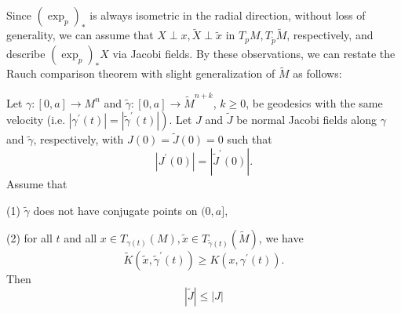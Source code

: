 \documentclass{ctexart}
\begin{document}
Since $(\exp_{p})_*$ is always isometric in the radial direction, without loss of generality, we can assume that $X \perp x, \widetilde{X} \perp \widetilde{x}$ 
in $T_pM, T_{\widetilde{p}}\widetilde{M}$, respectively, and describe $(\exp_{p})_* X$ via Jacobi fields. 
By these observations, we can restate the Rauch comparison theorem with slight generalization of $\widetilde{M}$ as follows:
\begin{theorem}
  Let $\gamma:[0, a] \rightarrow M^n$ and $\tilde{\gamma}:[0, a] \rightarrow \tilde{M}^{n+k}$, $k \geq 0$, be geodesics with the same velocity 
  (i.e. $\left.\left|\gamma^{\prime}(t)\right|=\left|\tilde{\gamma}^{\prime}(t)\right|\right)$. 
  Let $J$ and $\tilde{J}$ be normal Jacobi fields along $\gamma$ and $\tilde{\gamma}$, respectively, with $J(0)=\tilde{J}(0)=0$ such that
  $$
  \left|J^{\prime}(0)\right|=\left|\tilde{J}^{\prime}(0)\right| .
  $$
  Assume that 

  (1) $\tilde{\gamma}$ does not have conjugate points on $(0, a]$, 

  (2) for all $t$ and all $x \in T_{\gamma(t)}(M), \tilde{x} \in T_{\tilde{\gamma}(t)}(\tilde{M})$, we have
  $$
  \tilde{K}\left(\tilde{x}, \tilde{\gamma}^{\prime}(t)\right) \geq K\left(x, \gamma^{\prime}(t)\right). 
  $$
  Then
  $$
  |\tilde{J}| \leq|J|
  $$
\end{theorem}
\end{document}
